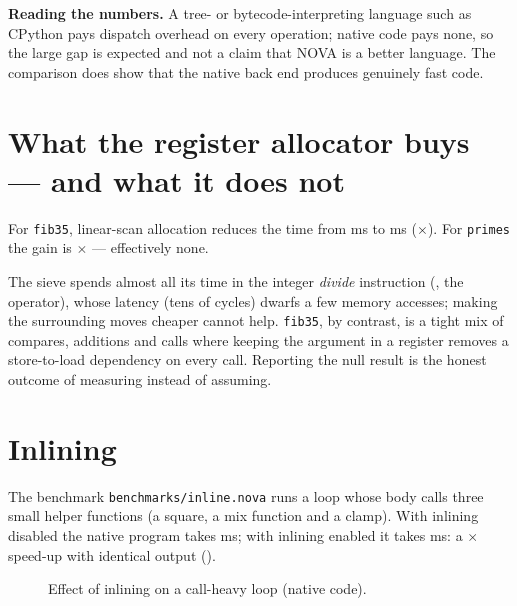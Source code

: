 \textbf{Reading the numbers.} A tree- or bytecode-interpreting language such as CPython pays dispatch overhead on every operation; native code pays none, so the large gap is expected and not a claim that NOVA is a better language. The comparison does show that the native back end produces genuinely fast code.

\section{What the register allocator buys --- and what it does not}
For \texttt{fib35}, linear-scan allocation reduces the time from \BenchFibNoreg{} ms to \BenchFibReg{} ms (\BenchFibVsnoreg$\times$). For \texttt{primes} the gain is \BenchPrimesVsnoreg$\times$ --- effectively none.

\begin{keybox}
The sieve spends almost all its time in the integer \emph{divide} instruction (, the \code{\%} operator), whose latency (tens of cycles) dwarfs a few memory accesses; making the surrounding moves cheaper cannot help. \texttt{fib35}, by contrast, is a tight mix of compares, additions and calls where keeping the argument in a register removes a store-to-load dependency on every call. Reporting the null result is the honest outcome of measuring instead of assuming.
\end{keybox}

\section{Inlining}
The benchmark \texttt{benchmarks/inline.nova} runs a loop whose body calls three small helper functions (a square, a mix function and a clamp). With inlining disabled the native program takes \BenchInlineOff{} ms; with inlining enabled it takes \BenchInlineOn{} ms: a \BenchInlineGain$\times$ speed-up with identical output ().

\begin{figure}[H]\centering
{}
\caption{Effect of inlining on a call-heavy loop (native code).}
\end{figure}

